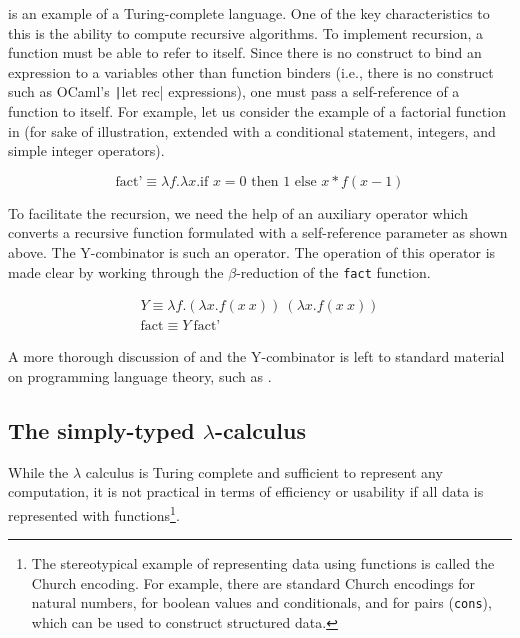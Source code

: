 \begin{singlespace}
\end{singlespace}

\ulc{} is an example of a Turing-complete language. One of the key characteristics to this is the ability to compute recursive algorithms. To implement recursion, a function must be able to refer to itself. Since there is no construct to bind an expression to a variables other than function binders (i.e., there is no construct such as OCaml's \texttt|let rec| expressions), one must pass a self-reference of a function to itself. For example, let us consider the example of a factorial function in \ulc{} (for sake of illustration, extended with a conditional statement, integers, and simple integer operators).

\[\text{fact'}\equiv\lambda f.\lambda x.\text{if }x=0\text{ then }1\text{ else }x*f(x-1)\]

To facilitate the recursion, we need the help of an auxiliary operator which converts a recursive function formulated with a self-reference parameter as shown above. The Y-combinator is such an operator. The operation of this operator is made clear by working through the $\beta$-reduction of the \texttt{fact} function.

\begin{singlespace}
  \begin{gather*}
    Y\equiv\lambda f.(\lambda x.f(x\ x))\ (\lambda x.f(x\ x)) \\
    \text{fact}\equiv Y\ \text{fact'}
  \end{gather*}
\end{singlespace}

A more thorough discussion of \ulc{} and the Y-combinator is left to standard material on programming language theory, such as \cite{harper2016practical}.

\subsection{The simply-typed $\lambda$-calculus}
\label{sec:stlc}

While the $\lambda$ calculus is Turing complete and sufficient to represent any computation, it is not practical in terms of efficiency or usability if all data is represented with functions\footnote{The stereotypical example of representing data using functions is called the Church encoding. For example, there are standard Church encodings for natural numbers, for boolean values and conditionals, and for pairs (\texttt{cons}), which can be used to construct structured data.}.

